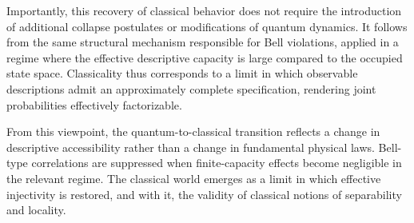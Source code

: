   Importantly, this recovery of classical behavior does not require the introduction
  of additional collapse postulates or modifications of quantum dynamics.
  It follows from the same structural mechanism responsible for Bell violations,
  applied in a regime where the effective descriptive capacity is large compared to
  the occupied state space.
  Classicality thus corresponds to a limit in which observable descriptions admit an
  approximately complete specification, rendering joint probabilities effectively
  factorizable.

  From this viewpoint, the quantum-to-classical transition reflects a change in
  descriptive accessibility rather than a change in fundamental physical laws.
  Bell-type correlations are suppressed when finite-capacity effects become negligible
  in the relevant regime.
  The classical world emerges as a limit in which effective injectivity is restored,
  and with it, the validity of classical notions of separability and locality.
